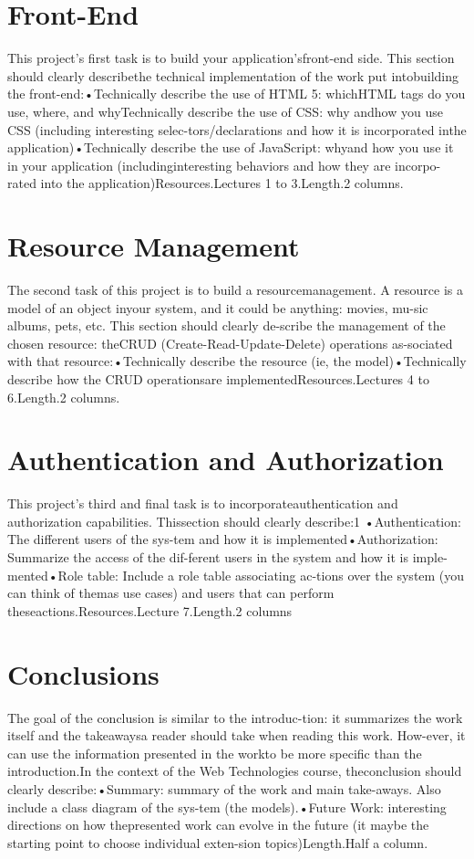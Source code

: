 \documentclass[12pt]{report}
\begin{document}
\chapter{Front-End}
This project’s first task is to build your application’sfront-end  side.   This  section  should  clearly  describethe  technical  implementation  of  the  work  put  intobuilding the front-end:•Technically describe the use of HTML 5:  whichHTML tags do you use, where, and whyTechnically  describe  the  use  of  CSS:  why  andhow  you  use  CSS  (including  interesting  selec-tors/declarations and how it is incorporated inthe application)•Technically describe the use of JavaScript:  whyand how you use it in your application (includinginteresting behaviors and how they are incorpo-rated into the application)Resources.Lectures 1 to 3.Length.2 columns.

\chapter{Resource Management}
The second task of this project is to build a resourcemanagement.  A resource is a model of an object inyour system, and it could be anything:  movies, mu-sic albums, pets, etc.  This section should clearly de-scribe  the  management  of  the  chosen  resource:  theCRUD  (Create-Read-Update-Delete)  operations  as-sociated with that resource:•Technically describe the resource (ie, the model)•Technically describe how the CRUD operationsare implementedResources.Lectures 4 to 6.Length.2 columns.

\chapter{Authentication and Authorization}
This project’s third and final task is to incorporateauthentication  and  authorization  capabilities.   Thissection should clearly describe:1
•Authentication:  The  different  users  of  the  sys-tem and how it is implemented•Authorization:  Summarize the access of the dif-ferent users in the system and how it is imple-mented•Role table:  Include a role table associating ac-tions  over  the  system  (you  can  think  of  themas use cases) and users that can perform theseactions.Resources.Lecture 7.Length.2 columns

\chapter{Conclusions}
The goal of the conclusion is similar to the introduc-tion: it summarizes the work itself and the takeawaysa reader should take when reading this work.  How-ever, it can use the information presented in the workto be more specific than the introduction.In the context of the Web Technologies course, theconclusion should clearly describe:•Summary:  summary of the work and main take-aways.  Also include a class diagram of the sys-tem (the models).•Future Work:  interesting directions on how thepresented work can evolve in the future (it maybe the starting point to choose individual exten-sion topics)Length.Half a column.
\end{document}
